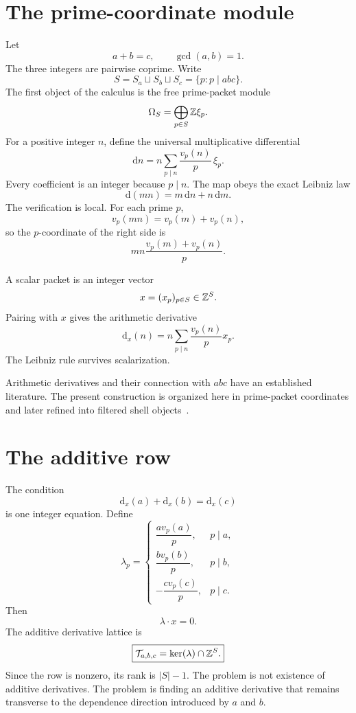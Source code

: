 
\section{The prime-coordinate module}
Let
\[
 a+b=c,
 \qquad
 \gcd(a,b)=1.
\]
The three integers are pairwise coprime. Write
\[
 S=S_a\sqcup S_b\sqcup S_c
 =\{p:p\mid abc\}.
\]
The first object of the calculus is the free prime-packet module
\[
 \Omega_S=\bigoplus_{p\in S}\mathbb Z\xi_p.
\]
For a positive integer $n$, define the universal multiplicative differential
\[
 \boxed{
 \mathrm dn
 =
 n\sum_{p\mid n}\frac{v_p(n)}p\,\xi_p.
 }
\]
Every coefficient is an integer because $p\mid n$. The map obeys the exact Leibniz law
\[
 \mathrm d(mn)=m\,\mathrm dn+n\,\mathrm dm.
\]
The verification is local. For each prime $p$,
\[
 v_p(mn)=v_p(m)+v_p(n),
\]
so the $p$-coordinate of the right side is
\[
 mn\frac{v_p(m)+v_p(n)}p.
\]

A scalar packet is an integer vector
\[
 x=(x_p)_{p\in S}\in\mathbb Z^S.
\]
Pairing with $x$ gives the arithmetic derivative
\[
 \boxed{
 \mathrm d_x(n)
 =
 n\sum_{p\mid n}\frac{v_p(n)}p x_p.
 }
\]
The Leibniz rule survives scalarization.

Arithmetic derivatives and their connection with $abc$ have an established literature. The present construction is organized here in prime-packet coordinates and later refined into filtered shell objects~\cite{PastenDerivatives,VojtaABC}.

\section{The additive row}
The condition
\[
 \mathrm d_x(a)+\mathrm d_x(b)=\mathrm d_x(c)
\]
is one integer equation. Define
\[
 \lambda_p=
 \begin{cases}
 \dfrac{a v_p(a)}p,&p\mid a,\\[6pt]
 \dfrac{b v_p(b)}p,&p\mid b,\\[6pt]
 -\dfrac{c v_p(c)}p,&p\mid c.
 \end{cases}
\]
Then
\[
 \boxed{\lambda\cdot x=0.}
\]
The additive derivative lattice is
\[
 \boxed{
 \mathcal T_{a,b,c}
 =
 \ker(\lambda)\cap\mathbb Z^S.
 }
\]
Since the row is nonzero, its rank is $|S|-1$. The problem is not existence of additive derivatives. The problem is finding an additive derivative that remains transverse to the dependence direction introduced by $a$ and $b$.

